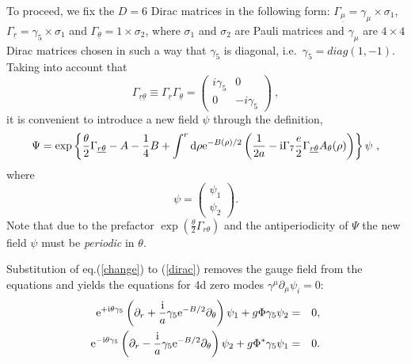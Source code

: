 \documentclass[a4paper,12pt]{article}
\begin{document}
To proceed, we fix the $D=6$ Dirac matrices in the following form:
$\Gamma_{\underline \mu}=\gamma_\mu\times\sigma_1$,
$\Gamma_{\underline{r}}=\gamma_5\times \sigma_1$ and 
$\Gamma_{\underline{\theta}}=1\times \sigma_2$, where $\sigma_1$ and
$\sigma_2$ are Pauli matrices and $\gamma_\mu$ are $4\times 4$ Dirac
matrices chosen in such a way that $\gamma_5$ is diagonal, 
i.e.~$\gamma_5=diag(1,-1)$. Taking into account that 
\begin{equation}
\Gamma_{\underline{r}\underline{\theta}} \equiv \Gamma_{\underline r}
\Gamma_{\underline\theta} = \left(\begin{array}{cc} i\gamma_5 &
0\\[2mm] 0 & -i\gamma_5 \end{array}\right)~,
\end{equation}
it is convenient to introduce a new  field $\psi$ through the definition,
\begin{equation}
\Psi = 
\exp\left\{\frac{\theta}{2}    
\Gamma_{\underline{r}\underline{\theta}} -A-{1\over 4}B +
\int^r{\rm d}\rho{\rm e}^{-B(\rho)/2}
\left({1\over 2a}-{\rm i}\Gamma_7{e\over 2}
\Gamma_{\underline{r}\underline{\theta}}
A_\theta(\rho)\right)\right\}\psi~,
\label{change}
\end{equation}
where
\begin{equation}
\psi=\left(\begin{array}{c}
\psi_1 \\ \psi_2 \end{array}\right).
\end{equation}
Note that due to the prefactor $\exp
{(\frac{\theta}{2}\Gamma_{r\theta})}$ and the antiperiodicity of
$\Psi$ the new field $\psi$ must be  {\it periodic}  in $\theta$.
  
Substitution of eq.(\ref{change}) to (\ref{dirac}) removes the gauge
field from the equations and yields the equations for 4d zero modes
$\gamma^{\mu}  \partial_\mu \psi_i=0$:
\begin{eqnarray}
{\rm e}^{+{\rm i}\theta\gamma_5}\left(\partial_r+{{\rm i}\over a}
\gamma_5{\rm
e}^{-B/2}\partial_\theta\right)\psi_1+g\Phi\gamma_5\psi_2 &=&0,\\
\nonumber
{\rm e}^{-{\rm i}\theta\gamma_5}\left(\partial_r-{{\rm i}\over a}
\gamma_5{\rm
e}^{-B/2}\partial_\theta\right)\psi_2+g\Phi^*\gamma_5\psi_1 &=&0.
\end{eqnarray}
\end{document}

